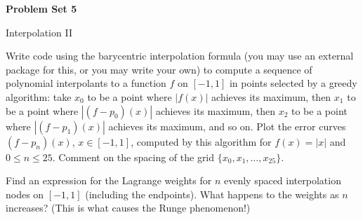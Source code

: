 \documentclass[11pt]{article}
\newcommand{\problem}[1]{\vspace{0.6em}\noindent{\large\bfseries #1.}\hspace{0.45em}}
\newcommand{\answerspace}{\par\vspace{3.5in}}
\begin{document}
\begin{center}
  {\fontsize{25}{30}\selectfont\bfseries Problem Set 5}\par
  \vspace{0.35em}
  {\large\color{gray!75!black}Interpolation II}
\end{center}
\vspace{0.75em}

\problem{1}
Write code using the barycentric interpolation formula (you may use an external
package for this, or you may write your own) to compute a sequence of
polynomial interpolants to a function $f$ on $[-1, 1]$ in points selected by a
greedy algorithm: take $x_0$ to be a point where $|f(x)|$ achieves its
maximum, then $x_1$ to be a point where $|(f - p_0)(x)|$ achieves its maximum,
then $x_2$ to be a point where $|(f - p_1)(x)|$ achieves its maximum, and so
on. Plot the error curves $(f - p_n)(x)$, $x \in [-1, 1]$, computed by this
algorithm for $f(x) = |x|$ and $0 \leq n \leq 25$. Comment on the spacing of
the grid $\{ x_0, x_1, \ldots, x_{25} \}$.
\answerspace

\problem{2}
Find an expression for the Lagrange weights for $n$ evenly spaced interpolation
nodes on $[-1, 1]$ (including the endpoints). What happens to the weights as
$n$ increases? (This is what causes the Runge phenomenon!)
\answerspace
\end{document}
